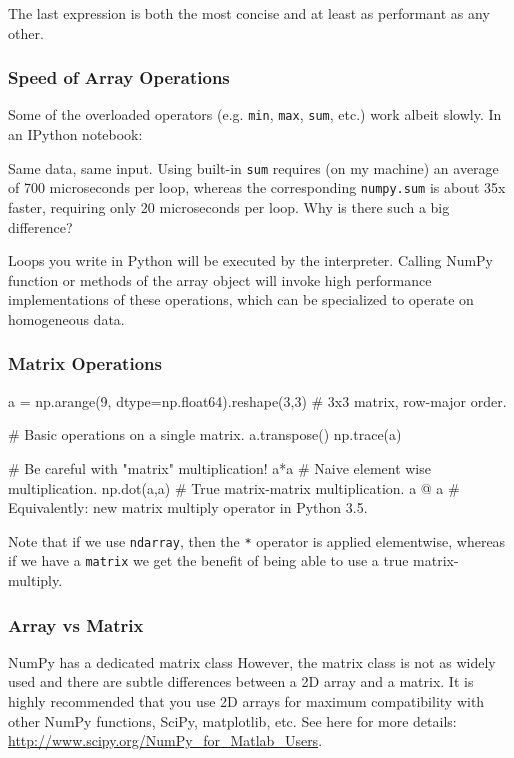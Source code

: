 \documentclass[12pt,letterpaper,twoside]{article}
\begin{document}
The last expression is both the most concise and at least as
performant as any other.

\subsubsection{Speed of Array Operations}

Some of the overloaded operators (e.g. \texttt{min}, \texttt{max},
\texttt{sum}, etc.) work albeit slowly.
In an IPython notebook:
\begin{python}
\end{python}

Same data, same input. Using built-in \texttt{sum} requires (on my
machine) an average of 700 microseconds per loop, whereas the
corresponding \texttt{numpy.sum} is about 35x faster, requiring only
20 microseconds per loop. Why is there such a big difference?

Loops you write in Python will be executed by the interpreter.
Calling NumPy function or methods of the array object will invoke high
performance implementations of these operations, which can be
specialized to operate on homogeneous data.

\subsubsection{Matrix Operations}

\begin{python}
a = np.arange(9, dtype=np.float64).reshape(3,3)  # 3x3 matrix, row-major order.

# Basic operations on a single matrix.
a.transpose()
np.trace(a)

# Be careful with "matrix" multiplication!
a*a           # Naive element wise multiplication.
np.dot(a,a)   # True matrix-matrix multiplication.
a @ a         # Equivalently: new matrix multiply operator in Python 3.5.
\end{python}

Note that if we use \texttt{ndarray}, then the \texttt{*} operator is
applied elementwise, whereas if we have a \texttt{matrix} we get the
benefit of being able to use a true matrix-multiply.

\subsubsection{Array vs Matrix}
NumPy has a dedicated matrix class
However, the matrix class is not as widely used and there are subtle
differences between a 2D array and a matrix.
It is highly recommended that you use 2D arrays for maximum
compatibility with other NumPy functions, SciPy, matplotlib, etc.
See here for more details:
\url{http://www.scipy.org/NumPy_for_Matlab_Users}.
\end{document}
